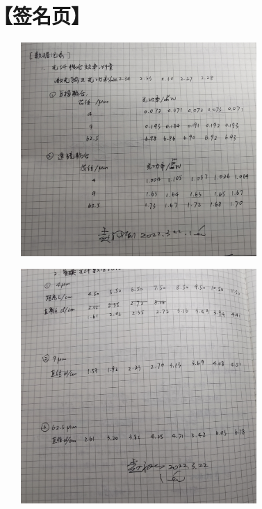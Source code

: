 \documentclass[10pt,a4paper,twoside,UTF8]{ctexart}
\begin{document}
\section*{【签名页】}
\begin{figure}[htbp]
	\centering
	\includegraphics[width=0.8\textwidth]{img//sig_1.jpg}
	\label{fig:sig_1}
\end{figure}
\begin{figure}[htbp]
	\centering
	\includegraphics[width=0.8\textwidth]{img//sig_2.jpg}
	\label{fig:sig_2}
\end{figure}
\end{document}
